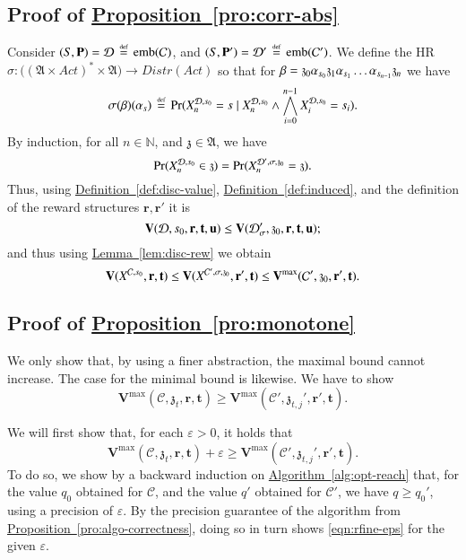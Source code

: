 \documentclass[10pt,twocolumn]{article}
\DeclareMathOperator{\prob}{Pr}
\newcommand{\states} {{\ensuremath S}}
\newcommand{\state}  {{\ensuremath s}}
\newcommand{\distrs} {{\ensuremath {\mathit{Distr}}}}
\newcommand{\nats}    {{\ensuremath {\mathbb{N}}}}
\newcommand{\sched}  {{\ensuremath {\sigma}}}
\newcommand{\acts}{\mathit{Act}}
\newcommand{\pmat}{\mathbf{P}}
\newcommand{\dmodel}{\mathcal{D}}
\newcommand{\cmodel}{\mathcal{C}}
\newcommand{\mpath}{\beta}
\newcommand{\urate}{\mathbf{u}}
\newcommand{\act}{\alpha}
\newcommand{\rew}{\mathbf{r}}
\newcommand{\timeb}{\mathbf{t}}
\newcommand{\mvalue}{\mathbf{V}}
\newcommand{\precision}{\varepsilon}
\newcommand{\emb}{\mathrm{emb}}
\newcommand{\stopro}{X}
\newcommand{\astates}{\mathfrak{A}}
\newcommand{\astate}{\mathfrak{z}}
\newcommand{\refdef}[1]{\texorpdfstring{\hyperref[def:#1]{Definition~\ref*{def:#1}}}{Definition \ref*{def:#1}}}
\newcommand{\reflem}[1]{\texorpdfstring{\hyperref[lem:#1]{Lemma~\ref*{lem:#1}}}{Lemma~\ref*{lem:#1}}}
\newcommand{\refpro}[1]{\texorpdfstring{\hyperref[pro:#1]{Proposition~\ref*{pro:#1}}}{Proposition~\ref*{pro:#1}}}
\newcommand{\refeqn}[1]{\texorpdfstring{\hyperref[eqn:#1]{\eqref{eqn:#1}}}{\eqref{eqn:#1}}}
\newcommand{\refalg}[1]{\texorpdfstring{\hyperref[alg:#1]{Algorithm~\ref*{alg:#1}}}{Algorithm~\ref*{alg:#1}}}
\newcommand{\defeq}{\,\stackrel{\mbox{\rm {\tiny def}}}{=}\,}
\begin{document}
\subsection*{Proof of \refpro{corr-abs}}
\label{apx:corr-abs}
\noindent
Consider $(\states, \pmat) = \dmodel \defeq \emb(\cmodel)$, and
$(\states, \pmat') = \dmodel' \defeq \emb(\cmodel')$.
We define the HR
$\sched\colon \bigl((\astates \times \acts)^* \times \astates\bigr) \to \distrs(\acts)$
so that for $\mpath = \astate_0 \act_{\state_0} \astate_1 \act_{\state_1} \ldots \act_{\state_{n-1}} \astate_n$ we have
\[
\sched(\mpath)(\act_\state) \defeq \prob(\stopro^{\dmodel,\state_0}_n = \state \mid \stopro^{\dmodel,\state_0}_n \wedge \bigwedge_{i=0}^{n-1} \stopro^{\dmodel,\state_0}_i = \state_i) .
\]
By induction, for all $n \in \nats$, and $\astate \in \astates$, we have
\[
\prob(\stopro^{\dmodel,\state_0}_n \in \astate) = \prob(\stopro^{\dmodel',\sched,\astate_0}_n = \astate) .
\]
Thus, using \refdef{disc-value}, \refdef{induced}, and the definition of the reward structures $\rew,\rew'$ it is
\[
\mvalue(\dmodel, \state_0, \rew, \timeb, \urate)
\leq \mvalue(\dmodel_\sched', \astate_0, \rew, \timeb, \urate);
\]
and thus using \reflem{disc-rew} we obtain
\[
\mvalue(\stopro^{\cmodel,\state_0}, \rew, \timeb)
\leq \mvalue(\stopro^{\cmodel',\sched,\astate_0},\rew',\timeb)
\leq \mvalue^{\max}(\cmodel', \astate_0, \rew', \timeb) .
\]

\subsection*{Proof of \refpro{monotone}}
\label{apx:monotone}
\noindent
We only show that, by using a finer abstraction, the maximal bound cannot increase.
The case for the minimal bound is likewise.
We have to show
\begin{equation}
  \label{eqn:rfine-eps-orig}
  \mvalue^{\max}(\cmodel, \astate_t, \rew, \timeb) \geq \mvalue^{\max}(\cmodel', \astate_{t,j}', \rew', \timeb) .
\end{equation}

We will first show that, for each $\precision > 0$, it holds that
\begin{equation}
  \label{eqn:rfine-eps}
  \mvalue^{\max}(\cmodel, \astate_t, \rew, \timeb) + \precision \geq \mvalue^{\max}(\cmodel', \astate_{t,j}', \rew', \timeb) .
\end{equation}
To do so, we show by a backward induction on \refalg{opt-reach} that, for the value $q_0$ obtained for $\cmodel$, and the value $q'$ obtained for $\cmodel'$, we have $q \geq q_0'$, using a precision of $\precision$.
By the precision guarantee of the algorithm from \refpro{algo-correctness}, doing so in turn shows \refeqn{rfine-eps} for the given $\precision$.
\end{document}
